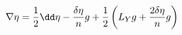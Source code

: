 \begin{equation}
\nabla\eta={1\over 2}\dd\eta -{\delta\eta\over n}g+{1\over 2}\left(
L_Yg+{2\delta\eta\over n}g\right)
\label{dekompozicio}
\end{equation}

